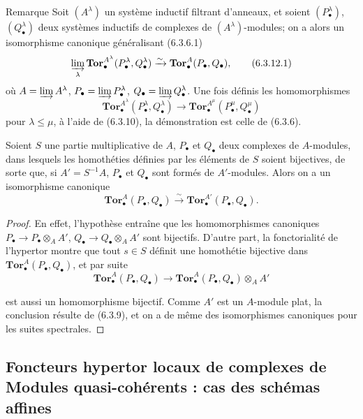 \begin{namedtheorem}[6.3.12]{Remarque}
Soit $(A^\lambda)$ un système inductif filtrant d'anneaux, et soient
$(P_\bullet^\lambda)$, $(Q_\bullet^\lambda)$ deux systèmes inductifs de
complexes de $(A^\lambda)$-modules; on a alors un isomorphisme canonique
généralisant (6.3.6.1)
\[
  \varinjlim_\lambda
  \mathbf{Tor}_\bullet^{A^\lambda}
  (P_\bullet^\lambda,Q_\bullet^\lambda)
  \xrightarrow{\sim}
  \mathbf{Tor}_\bullet^A(P_\bullet,Q_\bullet),
  \tag{6.3.12.1}\label{III.6.3.12.1.fr}
\]
où $A=\varinjlim A^\lambda$, $P_\bullet=\varinjlim P_\bullet^\lambda$,
$Q_\bullet=\varinjlim Q_\bullet^\lambda$. Une fois définis les
homomorphismes
\[
  \mathbf{Tor}_\bullet^{A^\lambda}
  (P_\bullet^\lambda,Q_\bullet^\lambda)
  \longrightarrow
  \mathbf{Tor}_\bullet^{A^\mu}
  (P_\bullet^\mu,Q_\bullet^\mu)
\]
pour $\lambda\leqslant\mu$, à l'aide de (6.3.10), la démonstration est celle
de (6.3.6).
\end{namedtheorem}

\begin{proposition}[6.3.13]
Soient $S$ une partie multiplicative de $A$, $P_\bullet$ et $Q_\bullet$ deux
complexes de $A$-modules, dans lesquels les homothéties définies par les
éléments de $S$ soient bijectives, de sorte que, si $A'=S^{-1}A$,
$P_\bullet$ et $Q_\bullet$ sont formés de $A'$-modules. Alors on a un
isomorphisme canonique
\[
  \mathbf{Tor}_\bullet^A(P_\bullet,Q_\bullet)
  \xrightarrow{\sim}
  \mathbf{Tor}_\bullet^{A'}(P_\bullet,Q_\bullet).
\]
\end{proposition}

\begin{proof}
En effet, l'hypothèse entraîne que les homomorphismes canoniques
$P_\bullet\to P_\bullet\otimes_A A'$,
$Q_\bullet\to Q_\bullet\otimes_A A'$ sont bijectifs. D'autre part, la
fonctorialité de l'hypertor montre que tout $s\in S$ définit une homothétie
bijective dans $\mathbf{Tor}_\bullet^A(P_\bullet,Q_\bullet)$, et par suite
\[
  \mathbf{Tor}_\bullet^A(P_\bullet,Q_\bullet)
  \longrightarrow
  \mathbf{Tor}_\bullet^A(P_\bullet,Q_\bullet)\otimes_A A'
\]


est aussi un homomorphisme bijectif. Comme $A'$ est un $A$-module plat, la
conclusion résulte de (6.3.9), et on a de même des isomorphismes canoniques
pour les suites spectrales.
\end{proof}

\subsection{Foncteurs hypertor locaux de complexes de Modules quasi-cohérents : cas des schémas affines}

